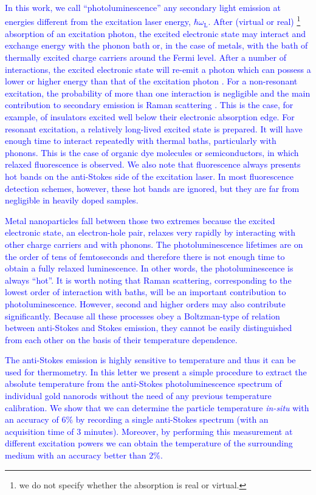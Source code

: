 \documentclass[journal=nalefd,manuscript=letter]{achemso}
\newcommand{\HI}[1]{\textcolor{blue}{#1}} %
\begin{document}
\HI{In this work, we call ``photoluminescence'' any secondary light  emission \cite{Orrit-Kottis} at energies
different from the excitation laser energy, $\hbar \omega_\textrm{L}$. After (virtual or real)
\footnote{we do not specify whether the absorption is real or virtual.} absorption 
of an excitation photon, the excited electronic state \cite{Mooradian1969,Dulkeith2004} 
may interact and exchange energy with the
phonon bath or, in the case of metals, with the bath of thermally excited charge carriers around the
Fermi level. After a number of interactions, the excited electronic state will re-emit a 
photon which can possess a lower or higher energy than that of the excitation photon
\cite{Hodak2000,Giri2015,Arbouet2003a}. For a non-resonant excitation, the probability 
of more than one interaction is negligible and the main contribution to secondary emission 
is Raman scattering \cite{Huang2014}. This is the case, for example, of insulators excited 
well below their electronic absorption edge. For resonant excitation, a relatively long-lived 
excited state is prepared. It will have enough time to interact repeatedly with thermal baths, 
particularly with phonons. This is the case of organic dye molecules or
semiconductors, in which relaxed fluorescence is observed. We also note that fluorescence 
always presents hot bands on the anti-Stokes side of the excitation laser. In most 
fluorescence detection schemes, however, these hot bands are ignored, but they are 
far from negligible in heavily doped samples\cite{Carattino2016a}.}

\HI{Metal nanoparticles fall between those two extremes because the excited electronic state, 
an electron-hole pair, relaxes very rapidly by interacting with other charge carriers and with phonons. 
The photoluminescence lifetimes are on the order of tens of femtoseconds\cite{link1999} and 
therefore there is not enough time to obtain a fully relaxed luminescence. In other words, the 
photoluminescence is always ``hot''. It is worth noting that Raman scattering, 
corresponding to the lowest order of interaction with baths, will be an important
contribution to photoluminescence\cite{Huang2014,mertens2017light}. However, second 
and higher orders may also contribute significantly. Because all these processes obey a 
Boltzman-type of relation between anti-Stokes and Stokes emission, they cannot be easily 
distinguished from each other on the basis of their temperature dependence.}


\HI{The anti-Stokes emission is highly sensitive to temperature and thus 
it can be used for thermometry\cite{xie2016thermometry}. In this letter we present 
a simple procedure to extract the absolute temperature from the anti-Stokes 
photoluminescence spectrum of individual gold nanorods without the need of 
any previous temperature calibration. We show that we can determine the particle temperature 
\textit{in-situ} with an accuracy of $6\%$ by recording a single anti-Stokes spectrum (with an 
acquisition time of $3$ minutes). 
Moreover, by performing this measurement at different excitation powers 
we can obtain the temperature of the surrounding medium with an accuracy better than $2\%$.}
\end{document}
